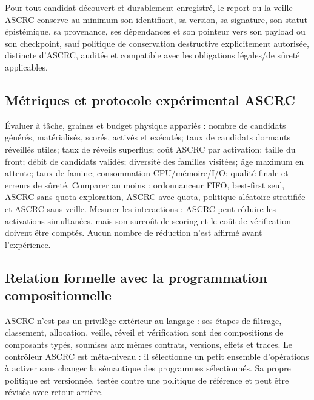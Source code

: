 \begin{invariant}
Pour tout candidat découvert et durablement enregistré, le report ou la veille ASCRC conserve au minimum son identifiant, sa version, sa signature, son statut épistémique, sa provenance, ses dépendances et son pointeur vers son payload ou son checkpoint, sauf politique de conservation destructive explicitement autorisée, distincte d'ASCRC, auditée et compatible avec les obligations légales/de sûreté applicables.
\end{invariant}

\subsection{Métriques et protocole expérimental ASCRC}
Évaluer à tâche, graines et budget physique appariés : nombre de candidats générés, matérialisés, scorés, activés et exécutés; taux de candidats dormants réveillés utiles; taux de réveils superflus; coût ASCRC par activation; taille du front; débit de candidats validés; diversité des familles visitées; âge maximum en attente; taux de famine; consommation CPU/mémoire/I/O; qualité finale et erreurs de sûreté. Comparer au moins : ordonnanceur FIFO, best-first seul, ASCRC sans quota exploration, ASCRC avec quota, politique aléatoire stratifiée et ASCRC sans veille. Mesurer les interactions : ASCRC peut réduire les activations simultanées, mais son surcoût de scoring et le coût de vérification doivent être comptés. Aucun nombre de réduction n'est affirmé avant l'expérience.

\subsection{Relation formelle avec la programmation compositionnelle}
ASCRC n'est pas un privilège extérieur au langage : ses étapes de filtrage, classement, allocation, veille, réveil et vérification sont des compositions de composants typés, soumises aux mêmes contrats, versions, effets et traces. Le contrôleur ASCRC est méta-niveau : il sélectionne un petit ensemble d'opérations à activer sans changer la sémantique des programmes sélectionnés. Sa propre politique est versionnée, testée contre une politique de référence et peut être révisée avec retour arrière.
